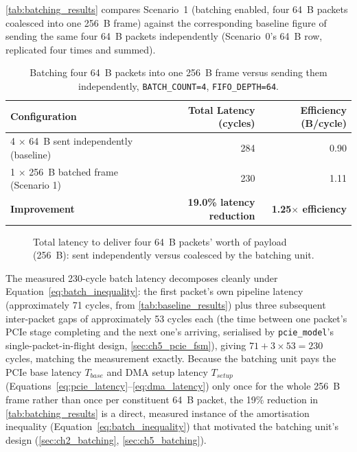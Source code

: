 \autoref{tab:batching_results} compares Scenario~1 (batching enabled, four 64~B packets coalesced into one 256~B frame) against the corresponding baseline figure of sending the same four 64~B packets independently (Scenario~0's 64~B row, replicated four times and summed).

\begin{table}[htbp]
\centering
\begin{tabular}{@{}lrr@{}}
\toprule
\textbf{Configuration} & \textbf{Total Latency (cycles)} & \textbf{Efficiency (B/cycle)} \\
\midrule
4 $\times$ 64~B sent independently (baseline) & 284 & 0.90 \\
1 $\times$ 256~B batched frame (Scenario 1)    & 230 & 1.11 \\
\midrule
\textbf{Improvement} & \textbf{19.0\% latency reduction} & \textbf{1.25$\times$ efficiency} \\
\bottomrule
\end{tabular}
\caption{Batching four 64~B packets into one 256~B frame versus sending them independently, \texttt{BATCH\_COUNT=4}, \texttt{FIFO\_DEPTH=64}.}
\label{tab:batching_results}
\end{table}

\begin{figure}[htbp]
\centering
{}
\caption{Total latency to deliver four 64~B packets' worth of payload (256~B): sent independently versus coalesced by the batching unit.}
\label{fig:batching_bar}
\end{figure}

The measured 230-cycle batch latency decomposes cleanly under Equation~\ref{eq:batch_inequality}: the first packet's own pipeline latency (approximately 71 cycles, from \autoref{tab:baseline_results}) plus three subsequent inter-packet gaps of approximately 53 cycles each (the time between one packet's PCIe stage completing and the next one's arriving, serialised by \texttt{pcie\_model}'s single-packet-in-flight design, \autoref{sec:ch5_pcie_fsm}), giving $71 + 3\times53 = 230$ cycles, matching the measurement exactly. Because the batching unit pays the PCIe base latency $T_{base}$ and DMA setup latency $T_{setup}$ (Equations~\ref{eq:pcie_latency}--\ref{eq:dma_latency}) only once for the whole 256~B frame rather than once per constituent 64~B packet, the 19\% reduction in \autoref{tab:batching_results} is a direct, measured instance of the amortisation inequality (Equation~\ref{eq:batch_inequality}) that motivated the batching unit's design (\autoref{sec:ch2_batching}, \autoref{sec:ch5_batching}).

